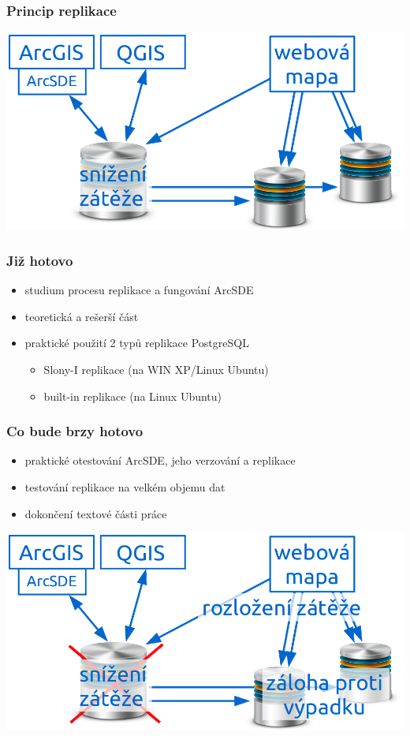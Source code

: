 \documentclass[xcolor=dvipsnames, 14pt]{beamer}
\begin{document}
  \begin{frame}
    \frametitle{Princip replikace}
    \centering
    \includegraphics[scale=0.45]{obr/schema14.png} 
  \end{frame}

  \begin{frame}
    \frametitle{Již hotovo}
    \begin{itemize}
      \item studium procesu replikace a fungování ArcSDE
      \item teoretická a rešerší část
      \item praktické použití 2 typů replikace PostgreSQL
          \begin{itemize}
            \item Slony-I replikace (na WIN XP/Linux Ubuntu)
            \item built-in replikace (na Linux Ubuntu)
          \end{itemize}
    \end{itemize}
  \end{frame}

  \begin{frame}
    \frametitle{Co bude brzy hotovo}
    \begin{itemize}
      \item praktické otestování ArcSDE, jeho verzování a replikace
      \item testování replikace na velkém objemu dat
      \item dokončení textové části práce
    \end{itemize}
  \end{frame}

  \begin{frame}
    \hspace*{2em}\includegraphics[scale=0.3]{obr/schema_zaver.png} 
      \vspace{30px}
      \newline{}
      
  \end{frame}
\end{document}
